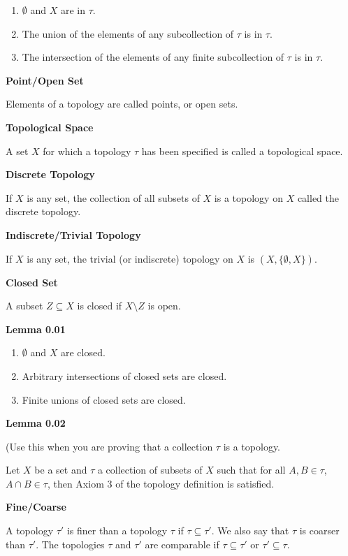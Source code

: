 \documentclass{article}
\begin{document}
    \begin{enumerate}
        \item $\emptyset$ and $X$ are in $\tau$.
        \item The union of the elements of any subcollection of $\tau$ is in $\tau$.
        \item The intersection of the elements of any finite subcollection of $\tau$ is in $\tau$.
    \end{enumerate}

\medskip\noindent\textbf{Point/Open Set}

	Elements of a topology are called points, or open sets.

\medskip\noindent\textbf{Topological Space}

    A set $X$ for which a topology $\tau$ has been specified is called a topological space.

\medskip\noindent\textbf{Discrete Topology}

    If $X$ is any set, the collection of all subsets of $X$ is a topology on $X$ called the discrete topology.

\medskip\noindent\textbf{Indiscrete/Trivial Topology}

    If $X$ is any set, the trivial (or indiscrete) topology on $X$ is $(X, \{\emptyset, X\})$.

\medskip\noindent\textbf{Closed Set}

	A subset $Z \subseteq X$ is closed if $X \setminus Z$ is open.

\medskip\noindent\textbf{Lemma 0.01}

	\begin{enumerate}
		\item $\emptyset$ and $X$ are closed.
		\item Arbitrary intersections of closed sets are closed.
		\item Finite unions of closed sets are closed.
	\end{enumerate}

\medskip\noindent\textbf{Lemma 0.02}

	(Use this when you are proving that a collection $\tau$ is a topology.
	
	Let $X$ be a set and $\tau$ a collection of subsets of $X$ such that for all $A,B \in \tau$, $A \cap B \in \tau$, then Axiom 3 of the topology definition is satisfied.

\medskip\noindent\textbf{Fine/Coarse}

	A topology $\tau'$ is finer than a topology $\tau$ if $\tau \subseteq \tau'$. We also say that $\tau$ is coarser than $\tau'$. The topologies $\tau$ and $\tau'$ are comparable if $\tau \subseteq \tau'$ or $\tau' \subseteq \tau$.
\end{document}
